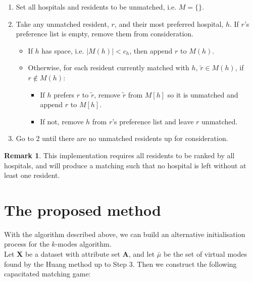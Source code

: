 \documentclass{article}
\theoremstyle{definition}
\newtheorem*{remark}{Remark}
\begin{document}
\begin{enumerate}
	\item Set all hospitals and residents to be unmatched, i.e. $M = \{\}$.
	
	\item Take any unmatched resident, $r$, and their most preferred hospital, $h$. If $r$'s preference list is empty, remove them from consideration.
	
		\begin{itemize}
			\item If $h$ has space, i.e. $|M(h)| < c_h$, then append $r$ to $M(h)$.
			
			\item Otherwise, for each resident currently matched with $h$, $\tilde{r} \in M(h)$, if $r \notin M(h)$:
			
				\begin{itemize}
					\item If $h$ prefers $r$ to $\tilde{r}$, remove $\tilde{r}$ from $M[h]$  so it is unmatched and append $r$ to $M[h]$.
					
					\item If not, remove $h$ from $r$'s preference list and leave $r$ unmatched.								
				\end{itemize}	
		\end{itemize}

	\item Go to 2 until there are no unmatched residents up for consideration.
\end{enumerate}

\begin{remark}
	This implementation requires all residents to be ranked by all hospitals, and will produce a matching such that no hospital is left without at least one resident.
\end{remark}



\section{The proposed method}\label{section:new-method}

With the algorithm described above, we can build an alternative initialisation process for the $k$-modes algorithm. \\

Let \textbf{X} be a dataset with attribute set \textbf{A}, and let $\bar{\mu}$ be the set of virtual modes found by the Huang method up to Step 3. Then we construct the following capacitated matching game:
\end{document}
